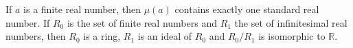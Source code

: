 If $a$ is a finite real number, then $\mu(a)$ contains exactly one standard real number. If $R_0$ is the set of finite real numbers and $R_1$ the set of infinitesimal real numbers, then $R_0$ is a ring, $R_1$ is an ideal of $R_0$ and $R_0/R_1$ is isomorphic to $\mathbb{R}$.
